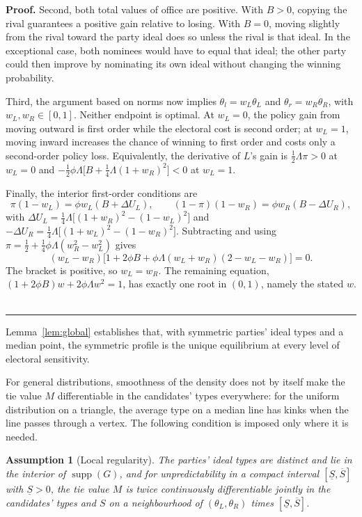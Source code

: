\documentclass[12pt,letterpaper]{article}
\newtheorem{assumption}{Assumption}
\newenvironment{proof}[1][Proof]{\noindent\textbf{#1.} }{\ \rule{0.5em}{0.5em}}
\begin{document}
\begin{proof}
Second, both total values of office are positive. With $B>0$, copying the rival guarantees a positive gain relative to losing. With $B=0$, moving slightly from the rival toward the party ideal does so unless the rival is that ideal. In the exceptional case, both nominees would have to equal that ideal; the other party could then improve by nominating its own ideal without changing the winning probability.

Third, the argument based on norms now implies $\theta_l=w_L\theta_L$ and $\theta_r=w_R\theta_R$, with $w_L,w_R\in[0,1]$. Neither endpoint is optimal. At $w_L=0$, the policy gain from moving outward is first order while the electoral cost is second order; at $w_L=1$, moving inward increases the chance of winning to first order and costs only a second-order policy loss. Equivalently, the derivative of $L$'s gain is $\tfrac12\Lambda\pi>0$ at $w_L=0$ and $-\tfrac12\phi\Lambda\big[B+\tfrac14\Lambda(1+w_R)^2\big]<0$ at $w_L=1$.

Finally, the interior first-order conditions are
\[
\pi(1-w_L)=\phi w_L(B+\Delta U_L),\qquad
(1-\pi)(1-w_R)=\phi w_R(B-\Delta U_R),
\]
with $\Delta U_L=\tfrac14\Lambda\big[(1+w_R)^2-(1-w_L)^2\big]$ and $-\Delta U_R=\tfrac14\Lambda\big[(1+w_L)^2-(1-w_R)^2\big]$. Subtracting and using $\pi=\tfrac12+\tfrac14\phi\Lambda(w_R^2-w_L^2)$ gives
\[
(w_L-w_R)\big[1+2\phi B+\phi\Lambda(w_L+w_R)(2-w_L-w_R)\big]=0.
\]
The bracket is positive, so $w_L=w_R$. The remaining equation, $(1+2\phi B)w+2\phi\Lambda w^2=1$, has exactly one root in $(0,1)$, namely the stated $w$.
\end{proof}

Lemma~\ref{lem:global} establishes that, with symmetric parties' ideal types and a median point, the symmetric profile is the unique equilibrium at every level of electoral sensitivity.

For general distributions, smoothness of the density does not by itself make the tie value $M$ differentiable in the candidates' types everywhere: for the uniform distribution on a triangle, the average type on a median line has kinks when the line passes through a vertex. The following condition is imposed only where it is needed.

\begin{assumption}[Local regularity]\label{ass:local}
The parties' ideal types are distinct and lie in the interior of $\operatorname{supp}(G)$, and for unpredictability in a compact interval $[\underline S,\overline S]$ with $\underline S>0$, the tie value $M$ is twice continuously differentiable jointly in the candidates' types and $S$ on a neighbourhood of $(\theta_L,\theta_R)$ times $[\underline S,\overline S]$.
\end{assumption}
\end{document}

